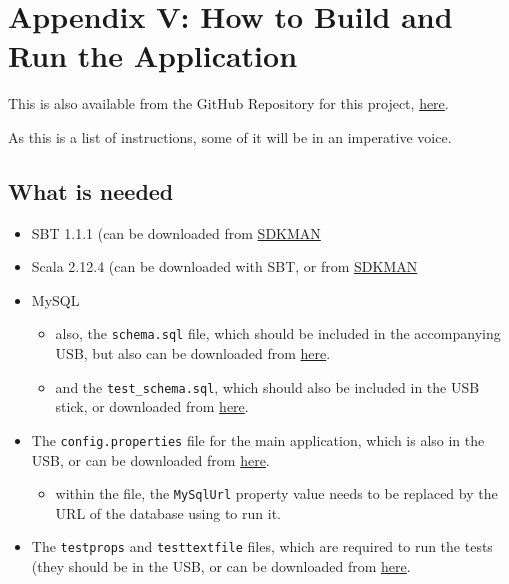 \section{Appendix V: How to Build and Run the Application} \label{appendix5}

This is also available from the GitHub Repository for this project,
\href{https://github.com/claudiusbr/personal_finance_system}{here}.

As this is a list of instructions, some of it will be in an imperative voice.

\subsection{What is needed}
\begin{itemize}
  \item
    SBT 1.1.1 (can be downloaded from \href{http://sdkman.io/}{SDKMAN}

  \item
    Scala 2.12.4 (can be downloaded with SBT, or from
    \href{http://sdkman.io/}{SDKMAN}

  \item
    MySQL
    \begin{itemize}
      \item
        also, the \texttt{schema.sql} file, which should be included in the accompanying USB, but also can be downloaded from \href{https://github.com/claudiusbr/personal_finance_system/tree/master/code/original_db_schemas/mysql}{here}.

      \item
        and the \texttt{test\_schema.sql}, which should also be included in the USB stick, or downloaded from \href{https://github.com/claudiusbr/personal_finance_system/tree/master/code/original_db_schemas/mysql}{here}.
    \end{itemize}

  \item
    The \texttt{config.properties} file for the main application, which is also in the USB, or can be downloaded from \href{https://github.com/claudiusbr/personal_finance_system/tree/master/code}{here}.
    \begin{itemize}
      \item
        within the file, the \texttt{MySqlUrl} property value needs to be
        replaced by the URL of the database using to run it.
    \end{itemize}


  \item
    The \texttt{testprops} and \texttt{testtextfile} files, which are required
    to run the tests (they should be in the USB, or can be downloaded from
    \href{https://github.com/claudiusbr/personal_finance_system/tree/master/code/src/test}{here}.


\end{itemize}
